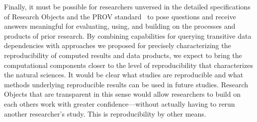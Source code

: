 Finally, it must be possible for researchers unversed in the detailed
	specifications of Research Objects and the PROV
	standard~\cite{groth2013provoverviewa} to pose questions and receive
	answers meaningful for evaluating, using, and building on the
	processes and products of prior research. 
By combining capabilities for querying transitive data dependencies with 
	approaches we proposed for precisely characterizing the reproducibility of computed
	results and data products, we expect to bring the computational components
	closer to the level of reproducibility that characterizes the natural sciences.
It would be clear what studies are reproducible and what methods underlying reproducible
	results can be used in future studies.
Research Objects that are transparent in this sense would allow researchers to build 
	on each others work with greater confidence---without 
	actually having to rerun another researcher's study.
This is reproducibility by other means.

